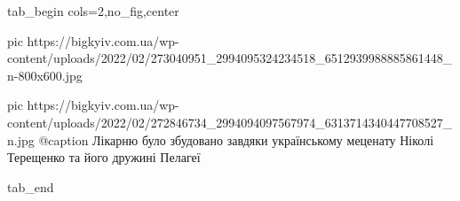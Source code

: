  
 
 
 
 


\ifcmt
  tab_begin cols=2,no_fig,center

     pic https://bigkyiv.com.ua/wp-content/uploads/2022/02/273040951_2994095324234518_6512939988885861448_n-800x600.jpg

		 pic https://bigkyiv.com.ua/wp-content/uploads/2022/02/272846734_2994094097567974_6313714340447708527_n.jpg
		 @caption Лікарню було збудовано завдяки українському меценату Ніколі Терещенко та його дружині Пелагеї

  tab_end
\fi
